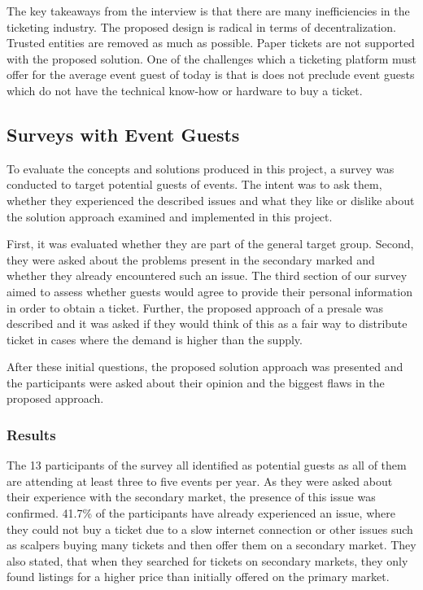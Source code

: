 The key takeaways from the interview is that there are many inefficiencies in the ticketing industry. The proposed design is radical in terms of decentralization. Trusted entities are removed as much as possible. Paper tickets are not supported with the proposed solution. One of the challenges which a ticketing platform must offer for the average event guest of today is that is does not preclude event guests which do not have the technical know-how or hardware to buy a ticket.

\subsection{Surveys with Event Guests}

To evaluate the concepts and solutions produced in this project, a survey was conducted to target potential guests of events. The intent was to ask them, whether they experienced the described issues and what they like or dislike about the solution approach examined and implemented in this project.

First, it was evaluated whether they are part of the general target group. Second, they were asked about the problems present in the secondary marked and whether they already encountered such an issue. The third section of our survey aimed to assess whether guests would agree to provide their personal information in order to obtain a ticket. Further, the proposed approach of a presale was described and it was asked if they would think of this as a fair way to distribute ticket in cases where the demand is higher than the supply.

After these initial questions, the proposed solution approach was presented and the participants were asked about their opinion and the biggest flaws in the proposed approach.

\subsubsection{Results}
The 13 participants of the survey all identified as potential guests as all of them are attending at least three to five events per year. As they were asked about their experience with the secondary market, the presence of this issue was confirmed. 41.7\% of the participants have already experienced an issue, where they could not buy a ticket due to a slow internet connection or other issues such as scalpers buying many tickets and then offer them on a secondary market. They also stated, that when they searched for tickets on secondary markets, they only found listings for a higher price than initially offered on the primary market.


